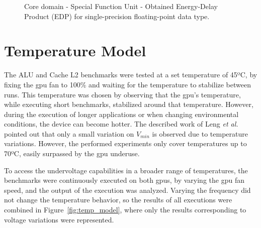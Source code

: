 \begin{figure}[!htb]
    \centering
    \begin{subfigmatrix}{2}
      \label{fig:SFU_EDP}
    \end{subfigmatrix}
    \caption{Core domain - Special Function Unit - Obtained Energy-Delay Product (EDP) for single-precision floating-point data type.}
\end{figure}


\section{Temperature Model}
\label{sec:temp_model}

The ALU and Cache L2 benchmarks were tested at a set temperature of 45ºC, by fixing the \acrshort{gpu} fan to 100\% and waiting for the temperature to stabilize between runs. This temperature was chosen by observing that the  \acrshort{gpu}'s temperature, while executing short benchmarks, stabilized around that temperature. However, during the execution of longer applications or when changing environmental conditions, the device can become hotter. The described work of Leng \textit{et al.}~\cite{leng_safe_2015} pointed out that only a small variation on $V_{min}$ is observed due to temperature variations. However, the performed experiments only cover temperatures up to 70ºC, easily surpassed by the \acrshort{gpu} underuse. 

To access the undervoltage capabilities in a broader range of temperatures, the benchmarks were continuously executed on both \acrshort{gpu}s, by varying the \acrshort{gpu} fan speed, and the output of the execution was analyzed. Varying the frequency did not change the temperature behavior, so the results of all executions were combined in Figure~\ref{fig:temp_model}, where only the results corresponding to voltage variations were represented. 

